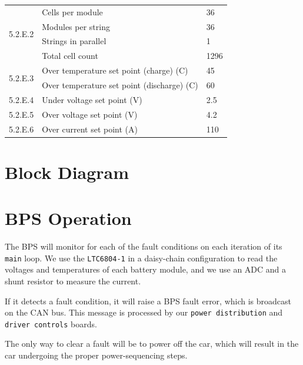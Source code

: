 \documentclass[10pt]{article}
\begin{document}
\begin{table}[!htbp]
\centering
\begin{tabular}{|l|l|l|}
\hline
\multirow{4}{*}{5.2.E.2} & Cells per module                           & 36   \\ \cline{2-3}
                         & Modules per string                         & 36   \\ \cline{2-3}
                         & Strings in parallel                        & 1    \\ \cline{2-3}
                         & Total cell count                           & 1296 \\ \hline
\multirow{2}{*}{5.2.E.3} & Over temperature set point (charge) (C)    & 45   \\ \cline{2-3}
                         & Over temperature set point (discharge) (C) & 60   \\ \hline
5.2.E.4                  & Under voltage set point (V)                & 2.5  \\ \hline
5.2.E.5                  & Over voltage set point (V)                 & 4.2  \\ \hline
5.2.E.6                  & Over current set point (A)                 & 110  \\ \hline
\end{tabular}
\end{table}

\section{Block Diagram}


\section{BPS Operation}

The BPS will monitor for each of the fault conditions on each iteration of its
\texttt{main} loop. We use the \texttt{LTC6804-1} in a daisy-chain
configuration to read the voltages and temperatures of each battery module, and
we use an ADC and a shunt resistor to measure the current.

If it detects a fault condition, it will raise a BPS fault error, which is
broadcast on the CAN bus. This message is processed by our
\texttt{power distribution} and \texttt{driver controls} boards.

The only way to clear a fault will be to power off the car, which will result
in the car undergoing the proper power-sequencing steps.
\end{document}
